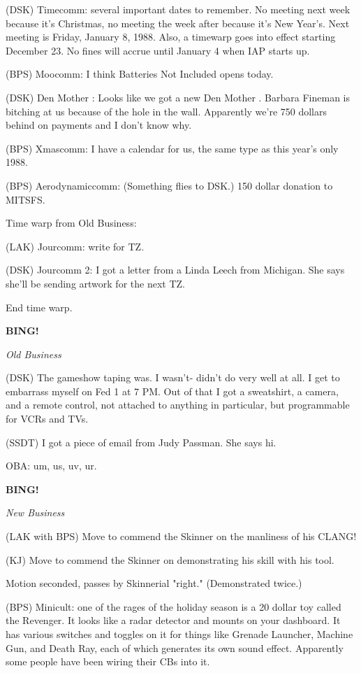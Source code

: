 \documentclass[12pt]{article}
\newcommand{\bing}{{\bf BING!} }
\newcommand{\goto}[1]{\bing \vskip 12pt \centerline{{\em{#1}}}}
\begin{document}
(DSK) Timecomm: several important dates to remember. No meeting next week because it's Christmas, no meeting the week after because it's New Year's. Next meeting is Friday, January 8, 1988. Also, a timewarp goes into effect starting December 23. No fines will accrue until January 4 when IAP starts up.

(BPS) Moocomm: I think Batteries Not Included opens today.

(DSK) Den Mother      : Looks like we got a new Den Mother      . Barbara Fineman is bitching at us because of the hole in the wall. Apparently we're 750 dollars behind on payments and I don't know why.

(BPS) Xmascomm: I have a calendar for us, the same type as this year's only 1988.

(BPS) Aerodynamiccomm: (Something flies to DSK.) 150 dollar donation to MITSFS.

Time warp from Old Business:

(LAK) Jourcomm: write for TZ.

(DSK) Jourcomm 2: I got a letter from a Linda Leech from Michigan. She says she'll be sending artwork for the next TZ.

End time warp.

\goto{Old Business}

(DSK) The gameshow taping was. I wasn't- didn't do very well at all. I get to embarrass myself on Fed 1 at 7 PM. Out of that I got a sweatshirt, a camera, and a remote control, not attached to anything in particular, but programmable for VCRs and TVs.

(SSDT) I got a piece of email from Judy Passman. She says hi.

OBA: um, us, uv, ur.

\goto{New Business}

(LAK with BPS) Move to commend the Skinner on the manliness of his CLANG!

(KJ) Move to commend the Skinner on demonstrating his skill with his tool.

Motion seconded, passes by Skinnerial "right." (Demonstrated twice.)

(BPS) Minicult: one of the rages of the holiday season is a 20 dollar toy called the Revenger. It looks like a radar detector and mounts on your dashboard. It has various switches and toggles on it for things like Grenade Launcher, Machine Gun, and Death Ray, each of which generates its own sound effect. Apparently some people have been wiring their CBs into it.
\end{document}
